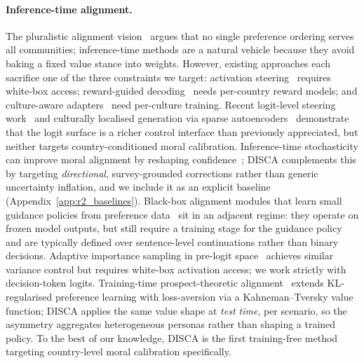 \documentclass{article}
\begin{document}
\paragraph{Inference-time alignment.}
The pluralistic alignment vision~\citep{sorensen2024roadmap} argues that no
single preference ordering serves all communities; inference-time methods are
a natural vehicle because they avoid baking a fixed value stance into weights.
However, existing approaches each sacrifice one of the three constraints we
target: activation steering~\citep{arditi2025refusal, zou2023representation}
requires white-box access; reward-guided
decoding~\citep{khanov2024args, mudgal2024controlled} needs per-country reward
models; and culture-aware
adapters~\citep{li2024culturemanager, yao2024caredio} need per-culture training.
Recent logit-level steering work~\citep{an2026logit} and culturally localised
generation via sparse autoencoders~\citep{khanuja2026steering} demonstrate that
the logit surface is a richer control interface than previously appreciated, but
neither targets country-conditioned moral calibration.
Inference-time stochasticity can improve moral alignment by reshaping
confidence~\citep{kwon2025dropouts}; DISCA complements this by targeting
\emph{directional}, survey-grounded corrections rather than generic
uncertainty inflation, and we include it as an explicit baseline
(Appendix~\ref{app:r2_baselines}). Black-box alignment modules that learn
small guidance policies from preference
data~\citep{lee2025pita, chen2025diffpo} sit in an adjacent regime: they
operate on frozen model outputs, but still require a training stage for the
guidance policy and are typically defined over sentence-level continuations
rather than binary decisions. Adaptive importance sampling in pre-logit
space~\citep{aisp2025} achieves similar variance control but requires
white-box activation access; we work strictly with decision-token logits.
Training-time prospect-theoretic alignment~\citep{ethayarajh2024kto}
extends KL-regularised preference learning with loss-aversion via a
Kahneman--Tversky value function; DISCA applies the same value shape
at \emph{test time}, per scenario, so the asymmetry aggregates
heterogeneous personas rather than shaping a trained policy.
To the best of our knowledge, DISCA is the first training-free method
targeting country-level moral calibration specifically.
\end{document}

